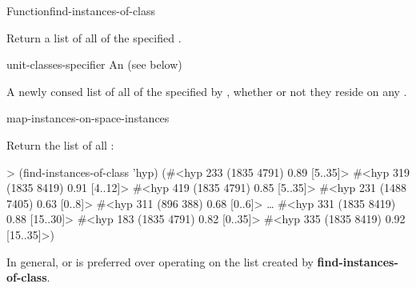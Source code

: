 \documentclass[10pt,twoside,english,pdftex]{article}
\begin{document}
\begin{functiondoc}{Function}{find-instances-of-class}%
  {
    \returns{} }
%
%
%

\fnsyntax

\fnpurpose Return a list of all  of the
specified .

\fnpackage {}

\fnmodule {}

\fnargs
\begin{args}{unit-classes-specifier}
 An 
(see below)
\end{args}

\fnreturns
{}%
%
A newly consed list of all  of the
 specified by ,
whether or not they reside on any .

\fndsyntax
\W\supp\tabletop
\unitclassesspec
\subclassingspec

\begin{alsos}{map-instances-on-space-instances}
\end{alsos}

\fnexample
Return the list of all  :
%
\W\supp
\begin{example}
> (find-instances-of-class 'hyp)
(#<hyp 233 (1835 4791) 0.89 [5..35]>
 #<hyp 319 (1835 8419) 0.91 [4..12]>
 #<hyp 419 (1835 4791) 0.85 [5..35]>
 #<hyp 231 (1488 7405) 0.63 [0..8]>
 #<hyp 311 (896 388) 0.68 [0..6]> 
   \textrm{\ldots{}}
 #<hyp 331 (1835 8419) 0.88 [15..30]>
 #<hyp 183 (1835 4791) 0.82 [0..35]>
 #<hyp 335 (1835 8419) 0.92 [15..35]>)
\end{example} 

\fnnote In general, \textbf{} or
\textbf{} is preferred over operating
on the list created by \textbf{find-instances-of-class}.

\end{functiondoc}
\end{document}
